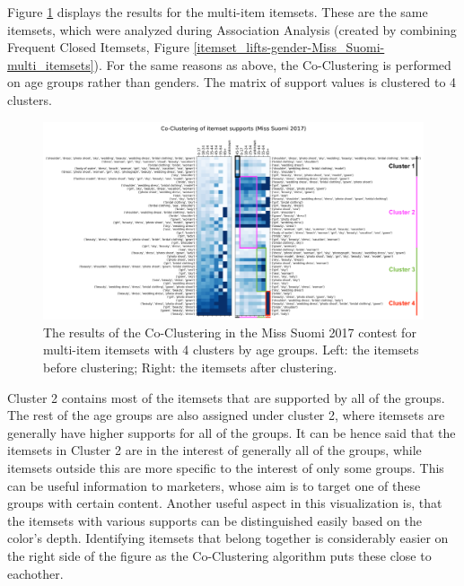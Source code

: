 Figure \ref{coclustering_miss-suomi-age_groups-multi-itemsets-4_clusters} displays the results for the multi-item itemsets. These are the same itemsets, which were analyzed during Association Analysis (created by combining Frequent Closed Itemsets, Figure \ref{itemset_lifts-gender-Miss_Suomi-multi_itemsets}). For the same reasons as above, the Co-Clustering is performed on age groups rather than genders. The matrix of support values is clustered to 4 clusters. 

\begin{figure} 
    \begin{center}
        \includegraphics[width=1.2\textwidth,center]{Images/coclustering_miss-suomi-age_groups-multi-itemsets-4_clusters.png}
        \caption{The results of the Co-Clustering in the Miss Suomi 2017 contest for multi-item itemsets with 4 clusters by age groups. Left: the itemsets before clustering; Right: the itemsets after clustering.}
        \label{coclustering_miss-suomi-age_groups-multi-itemsets-4_clusters}
    \end{center}
\end{figure}

Cluster 2 contains most of the itemsets that are supported by all of the groups. The rest of the age groups are also assigned under cluster 2, where itemsets are generally have higher supports for all of the groups. It can be hence said that the itemsets in Cluster 2 are in the interest of generally all of the groups, while itemsets outside this are more specific to the interest of only some groups. This can be useful information to marketers, whose aim is to target one of these groups with certain content. Another useful aspect in this visualization is, that the itemsets with various supports can be distinguished easily based on the color's depth. Identifying itemsets that belong together is considerably easier on the right side of the figure as the Co-Clustering algorithm puts these close to eachother. 

